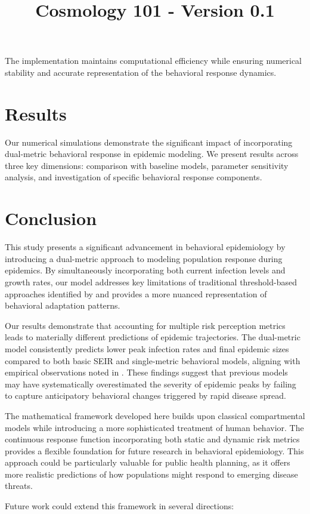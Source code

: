 \documentclass{article}\usepackage{graphicx} \usepackage{amsmath} \usepackage{colortbl}\title{Cosmology 101 - Version 0.1}
\begin{document}
The implementation maintains computational efficiency while ensuring numerical stability and accurate representation of the behavioral response dynamics.\section{Results}
Our numerical simulations demonstrate the significant impact of incorporating dual-metric behavioral response in epidemic modeling. We present results across three key dimensions: comparison with baseline models, parameter sensitivity analysis, and investigation of specific behavioral response components.

\section{Conclusion}
This study presents a significant advancement in behavioral epidemiology by introducing a dual-metric approach to modeling population response during epidemics. By simultaneously incorporating both current infection levels and growth rates, our model addresses key limitations of traditional threshold-based approaches identified by \cite{funk2010modelling} and provides a more nuanced representation of behavioral adaptation patterns.

Our results demonstrate that accounting for multiple risk perception metrics leads to materially different predictions of epidemic trajectories. The dual-metric model consistently predicts lower peak infection rates and final epidemic sizes compared to both basic SEIR and single-metric behavioral models, aligning with empirical observations noted in \cite{wang2020impact}. These findings suggest that previous models may have systematically overestimated the severity of epidemic peaks by failing to capture anticipatory behavioral changes triggered by rapid disease spread.

The mathematical framework developed here builds upon classical compartmental models \cite{anderson1992infectious} while introducing a more sophisticated treatment of human behavior. The continuous response function incorporating both static and dynamic risk metrics provides a flexible foundation for future research in behavioral epidemiology. This approach could be particularly valuable for public health planning, as it offers more realistic predictions of how populations might respond to emerging disease threats.

Future work could extend this framework in several directions:
\end{document}
